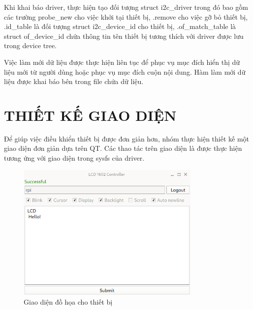 \documentclass{report}
\begin{document}
Khi khai báo driver, thực hiện tạo đối tượng struct i2c\_driver trong đó bao gồm các trường probe\_new cho việc khởi tại thiết bị, .remove cho việc 	gỡ bỏ thiết bị, .id\_table là đối tượng struct i2c\_device\_id cho thiết bị, .of\_match\_table là struct of\_device\_id chứa thông tin tên thiết bị tương thích với driver được lưu trong device tree.


Việc làm mới dữ liệu được thực hiện liên tục để phục vụ mục đích hiển thị dữ liệu mới từ người dùng hoặc phục vụ mục đích cuộn nội dung. Hàm làm mới dữ liệu được khai báo bên trong file chứa dữ liệu.



\chapter{THIẾT KẾ GIAO DIỆN}
Để giúp việc điều khiển thiết bị được đơn giản hơn, nhóm thực hiện thiết kế một giao diện đơn giản dựa trên QT. Các thao tác trên giao diện là được thực hiện tương ứng với giao diện trong sysfs của driver.

\begin{figure}[H]
	\centering
	\includegraphics[width=0.8\textwidth]{../images/gui.png}
	\caption{Giao diện đồ họa cho thiết bị}
\end{figure}
\end{document}
